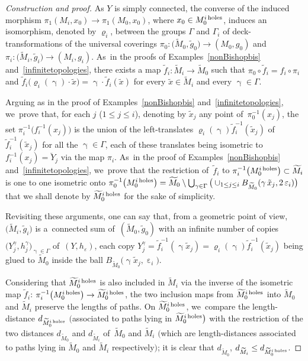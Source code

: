 \documentclass[10pt,a4paper]{amsart}
\numberwithin{equation}{section}
\newcommand{\f}{\rightarrow}
\newcommand{\g}{\operatorname{\gamma}}
\newcommand{\e}{\operatorname{\varepsilon}}
\begin{document}
\begin{proof}[Construction and proof]
As $Y$ is simply connected, the converse of the induced morphism $\pi_1 (M_i, x_0) \f \pi_1 (M_0, x_0)$, where $x_0 \in M_0^{i {\rm \, holes}}$,
induces an isomorphism, denoted by $\varrho_i $,
between the groups $\Gamma$ and $\Gamma_i$ of deck-transformations of the
universal coverings $\pi_0 \colon \big(\widetilde M_0, \tilde g_0\big)
\f (M_0, g_0)$ and $\pi_i \colon \big(\widetilde M_i, \tilde g_i\big) \f (M_i, g_i)$. As~in the proofs of Examples~\ref{nonBishopbis} and~\ref{infinitetopologies}, there exists a map $\tilde f_i \colon \widetilde M_i \f \widetilde M_0$ such
that $\pi_0 \circ \tilde f_i = f_i \circ \pi_i$ and $ \tilde f_i \big(\varrho_i (\g) \cdot \tilde x\big) = \g \cdot \tilde f_i (\tilde x)$ for every $\tilde x \in \widetilde M_i$ and every $\g \in \Gamma$.

Arguing as in the proof of Examples~\ref{nonBishopbis} and~\ref{infinitetopologies}, we~prove that, for each $j$ ($1 \le j \le i$), denoting by $\tilde x_j$ any
point of~$\pi_0^{-1} (x_j)$, the set $\pi_i^{-1} \big( f_i^{-1} (x_j)\big)$ is the union of the left-translates $ \varrho_i (\g) \tilde f_i^{-1} (
\tilde x_j) $ of~$\tilde f_i^{-1} ( \tilde x_j) $ for all the
$\g \in \Gamma$, each of these translates being isometric to $ f_i^{-1} (x_j) = \breve Y_j $ via the map $\pi_i$. As~in the proof of Examples~\ref{nonBishopbis} and~\ref{infinitetopologies}, we~prove that the restriction of~$\tilde f_i$ to
$\pi_i^{-1} \big( M_0^{i {\rm \, holes}}\big) \subset \widetilde M_i$ is one to one isometric onto $\pi_0^{-1} \big( M_0^{i {\rm \, holes}}\big) =
\widetilde M_0 \setminus \bigcup_{\g \in \Gamma} \big(\cup_{1 \le j \le i} B_{\widetilde M_0} (\g \tilde x_j, 2 \e_i)\big)$ that we shall denote by $\widetilde M_0^{i {\rm \, holes}}$ for the sake of simplicity.

Revisiting these arguments, one can say that, from a geometric point of view, $\big(\widetilde M_i, \tilde g_i\big)$ is a~connected sum of~$(\widetilde M_0, \tilde g_0)$ with an infinite
number of copies $\big(Y_j^\gamma, h_j^\gamma\big)_{\g \in \Gamma}$ of~$(Y, h_\varepsilon)$, each copy $Y_j^\gamma = \tilde f_i^{-1} (\g \tilde x_j) =
\varrho_i (\g) \tilde f_i^{-1} (\tilde x_j) $ being glued to $\widetilde M_0$ inside the ball $B_{\widetilde M_0} \big(\g \tilde x_j, \e_i \big)$.

Considering that $\widetilde M_0^{i {\rm \, holes}}$ is also included in $\widetilde M_i$ via
the inverse of the isometric map $\tilde f_i$: $ \pi_i^{-1} \big( M_0^{i {\rm \, holes}}\big) \f \widetilde M_0^{i {\rm \, holes}}$, the two inclusion maps from $\widetilde M_0^{i {\rm \, holes}}$ into $\widetilde M_0 $ and $\widetilde M_i $ preserve the lengths of paths. On
$\widetilde M_0^{i {\rm \, holes}}$, we~compare the length-distance $d_{\widetilde M_0^{i {\rm \, holes}}}$ $\big($associated to paths lying in $\widetilde M_0^{i {\rm \, holes}}\big)$ with the restriction
of the two distances $d_{\widetilde M_0 }$ and $d_{\widetilde M_i }$ of~$\widetilde M_0$ and $\widetilde M_i$ $\big($which are length-distances associated to
paths lying in $\widetilde M_0 $ and $\widetilde M_i $ respectively$\big)$; it is clear that $ d_{\widetilde M_0 }$, $d_{\widetilde M_i } \le d_{\widetilde M_0^{i {\rm \, holes}}}$.


\end{proof}
\end{document}
